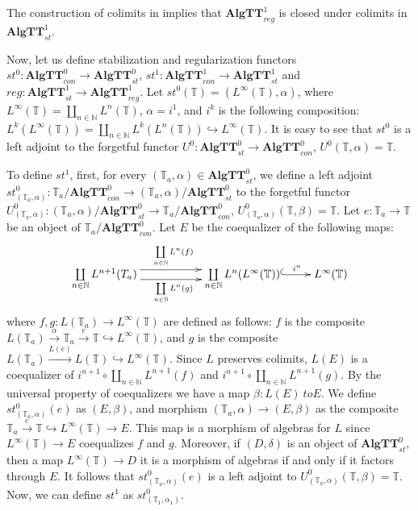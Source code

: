 \documentclass{elsarticle}
\theoremstyle{definition}
\theoremstyle{remark}
\newcommand{\cat}[1]{\mathbf{#1}}
\newcommand{\algtt}{\cat{AlgTT}}
\numberwithin{figure}{section}
\begin{document}
The construction of colimits in  implies that $\algtt^1_{reg}$ is closed under colimits in $\algtt^1_{st}$.

Now, let us define stabilization and regularization functors $st^0 : \algtt^0_{con} \to \algtt^0_{st}$,
    $st^1 : \algtt^1_{con} \to \algtt^1_{st}$ and $reg : \algtt^1_{st} \to \algtt^1_{reg}$.
Let $st^0(\mathbb{T}) = (L^\infty(\mathbb{T}), \alpha)$, where $L^\infty(\mathbb{T}) = \coprod\limits_{n \in \mathbb{N}} L^n(\mathbb{T})$, $\alpha = i^1$, and $i^k$ is the following composition:
    $L^k(L^\infty(\mathbb{T})) = \coprod\limits_{n \in \mathbb{N}} L^k(L^n(\mathbb{T})) \hookrightarrow L^\infty(\mathbb{T})$.
It is easy to see that $st^0$ is a left adjoint to the forgetful functor $U^0 : \algtt^0_{st} \to \algtt^0_{con}$, $U^0(\mathbb{T},\alpha) = \mathbb{T}$.

To define $st^1$, first, for every $(\mathbb{T}_a,\alpha) \in \algtt^0_{st}$, we define a left adjoint $st^0_{(\mathbb{T}_a,\alpha)} : \mathbb{T}_a/\algtt^0_{con} \to (\mathbb{T}_a,\alpha)/\algtt^0_{st}$
    to the forgetful functor $U^0_{(\mathbb{T}_a,\alpha)} : (\mathbb{T}_a,\alpha)/\algtt^0_{st} \to \mathbb{T}_a/\algtt^0_{con}$,
    $U^0_{(\mathbb{T}_a,\alpha)}(\mathbb{T},\beta) = \mathbb{T}$.
Let $e : \mathbb{T}_a \to \mathbb{T}$ be an object of $\mathbb{T}_a/\algtt^0_{con}$.
Let $E$ be the coequalizer of the following maps:
\[ \xymatrix{ \coprod\limits_{n \in \mathbb{N}} L^{n+1}(T_a) \ar@<+1ex>[rr]^{\coprod\limits_{n \in \mathbb{N}} L^n(f)} \ar@<-1ex>[rr]_{\coprod\limits_{n \in \mathbb{N}} L^n(g)}
    & & \coprod\limits_{n \in \mathbb{N}} L^n(L^\infty(\mathbb{T})) \ar@{^{(}->}[r]^-{i^n} & L^\infty(\mathbb{T}) } \]
    where $f,g : L(\mathbb{T}_a) \to L^\infty(\mathbb{T})$ are defined as follows: $f$ is the composite $L(\mathbb{T}_a) \xrightarrow{\alpha} \mathbb{T}_a \xrightarrow{e} \mathbb{T} \hookrightarrow L^\infty(\mathbb{T})$,
    and $g$ is the composite $L(\mathbb{T}_a) \xrightarrow{L(e)} L(\mathbb{T}) \hookrightarrow L^\infty(\mathbb{T})$.
Since $L$ preserves colimits, $L(E)$ is a coequalizer of $i^{n+1} \circ \coprod_{n \in \mathbb{N}} L^{n+1}(f)$ and $i^{n+1} \circ \coprod_{n \in \mathbb{N}} L^{n+1}(g)$.
By the universal property of coequalizers we have a map $\beta : L(E) \ to E$.
We define $st^0_{(\mathbb{T}_a,\alpha)}(e)$ as $(E,\beta)$, and morphism $(\mathbb{T}_a,\alpha) \to (E,\beta)$ as the composite $\mathbb{T}_a \xrightarrow{e} \mathbb{T} \hookrightarrow L^\infty(\mathbb{T}) \to E$.
This map is a morphism of algebras for $L$ since $L^\infty(\mathbb{T}) \to E$ coequalizes $f$ and $g$.
Moreover, if $(D,\delta)$ is an object of $\algtt^0_{st}$, then a map $L^\infty(\mathbb{T}) \to D$ it is a morphism of algebras if and only if it factors through $E$.
It follows that $st^0_{(\mathbb{T}_a,\alpha)}(e)$ is a left adjoint to $U^0_{(\mathbb{T}_a,\alpha)}(\mathbb{T},\beta) = \mathbb{T}$.
Now, we can define $st^1$ as $st^0_{(\mathbb{T}_1,\alpha_1)}$.
\end{document}
